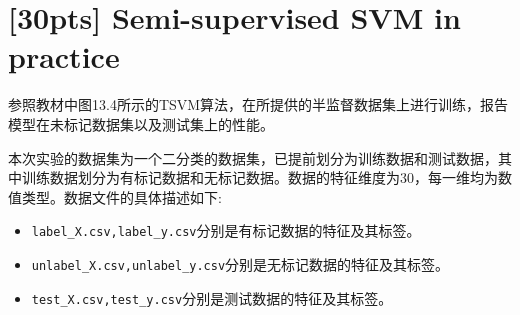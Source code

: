 \documentclass[a4paper,UTF8]{article}
\numberwithin{equation}{section}
\begin{document}
\section{\textbf{[30pts]} Semi-supervised SVM in practice}
参照教材中图13.4所示的TSVM算法，在所提供的半监督数据集上进行训练，报告模型在未标记数据集以及测试集上的性能。

本次实验的数据集为一个二分类的数据集，已提前划分为训练数据和测试数据，其中训练数据划分为有标记数据和无标记数据。数据的特征维度为30，每一维均为数值类型。数据文件的具体描述如下:
\begin{itemize}
    \item \texttt{label\_X.csv,label\_y.csv}分别是有标记数据的特征及其标签。
    \item \texttt{unlabel\_X.csv,unlabel\_y.csv}分别是无标记数据的特征及其标签。
    \item \texttt{test\_X.csv,test\_y.csv}分别是测试数据的特征及其标签。
\end{itemize}
\end{document}
